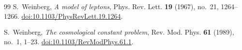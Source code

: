 \documentclass[11pt,reqno]{amsart}
\theoremstyle{definition}
\begin{document}
\begin{thebibliography}{99}
S.~Weinberg,
\emph{A model of leptons},
Phys. Rev. Lett. \textbf{19} (1967), no.~21, 1264--1266.
\href{https://doi.org/10.1103/PhysRevLett.19.1264}{doi:10.1103/PhysRevLett.19.1264}.

S.~Weinberg,
\emph{The cosmological constant problem},
Rev. Mod. Phys. \textbf{61} (1989), no.~1, 1--23.
\href{https://doi.org/10.1103/RevModPhys.61.1}{doi:10.1103/RevModPhys.61.1}.

\end{thebibliography}
\end{document}
